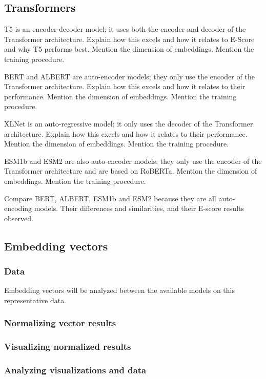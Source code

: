 \documentclass[
	letterpaper, %
	10pt, %
]{journalArticle}
\begin{document}
\subsection{Transformers}
T5 is an encoder-decoder model; it uses both the encoder and decoder of the Transformer architecture. Explain how this excels and how it relates to E-Score and why T5 performs best. Mention the dimension of embeddings. Mention the training procedure.

BERT and ALBERT are auto-encoder models; they only use the encoder of the Transformer architecture. Explain how this excels and how it relates to their performance. Mention the dimension of embeddings. Mention the training procedure.

XLNet is an auto-regressive model; it only uses the decoder of the Transformer architecture. Explain how this excels and how it relates to their performance. Mention the dimension of embeddings. Mention the training procedure.

ESM1b and ESM2 are also auto-encoder models; they only use the encoder of the Transformer architecture and are based on RoBERTa. Mention the dimension of embeddings. Mention the training procedure.

Compare BERT, ALBERT, ESM1b and ESM2 because they are all auto-encoding models. Their differences and similarities, and their E-score results observed.

\subsection{Embedding vectors}

\subsubsection{Data}
Embedding vectors will be analyzed between the available models on this representative data.

\subsubsection{Normalizing vector results}

\subsubsection{Visualizing normalized results}

\subsubsection{Analyzing visualizations and data}
\end{document}
